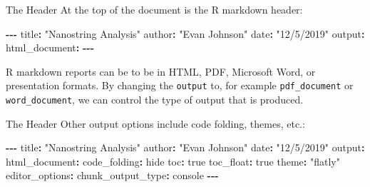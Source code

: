 \documentclass[
  ignorenonframetext,
  aspectratio=169]{beamer}
\newenvironment{Shaded}{\begin{snugshade}}{\end{snugshade}}
\newcommand{\NormalTok}[1]{#1}
\newcommand{\SpecialCharTok}[1]{\textcolor[rgb]{0.81,0.36,0.00}{\textbf{#1}}}
\newcommand{\StringTok}[1]{\textcolor[rgb]{0.31,0.60,0.02}{#1}}
\begin{document}
\begin{frame}[fragile]{The Header}
\label{the-header}
At the top of the document is the R markdown header:

\begin{Shaded}
\begin{Highlighting}[]
\SpecialCharTok{{-}{-}{-}}
\NormalTok{title}\SpecialCharTok{:} \StringTok{"Nanostring Analysis"}
\NormalTok{author}\SpecialCharTok{:} \StringTok{"Evan Johnson"}
\NormalTok{date}\SpecialCharTok{:} \StringTok{"12/5/2019"}
\NormalTok{output}\SpecialCharTok{:}\NormalTok{ html\_document}\SpecialCharTok{:}
\SpecialCharTok{{-}{-}{-}}
\end{Highlighting}
\end{Shaded}

R markdown reports can be to be in HTML, PDF, Microsoft Word, or
presentation formats. By changing the \texttt{output} to, for example
\texttt{pdf\_document} or \texttt{word\_document}, we can control the
type of output that is produced.
\end{frame}

\begin{frame}[fragile]{The Header}
\label{the-header-1}
Other output options include code folding, themes, etc.:

\begin{Shaded}
\begin{Highlighting}[]
\SpecialCharTok{{-}{-}{-}}
\NormalTok{title}\SpecialCharTok{:} \StringTok{"Nanostring Analysis"}
\NormalTok{author}\SpecialCharTok{:} \StringTok{"Evan Johnson"}
\NormalTok{date}\SpecialCharTok{:} \StringTok{"12/5/2019"}
\NormalTok{output}\SpecialCharTok{:}
\NormalTok{  html\_document}\SpecialCharTok{:}
\NormalTok{    code\_folding}\SpecialCharTok{:}\NormalTok{ hide}
\NormalTok{    toc}\SpecialCharTok{:}\NormalTok{ true}
\NormalTok{    toc\_float}\SpecialCharTok{:}\NormalTok{ true}
\NormalTok{    theme}\SpecialCharTok{:} \StringTok{"flatly"}
\NormalTok{editor\_options}\SpecialCharTok{:} 
\NormalTok{  chunk\_output\_type}\SpecialCharTok{:}\NormalTok{ console}
\SpecialCharTok{{-}{-}{-}}
\end{Highlighting}
\end{Shaded}
\end{frame}
\end{document}
